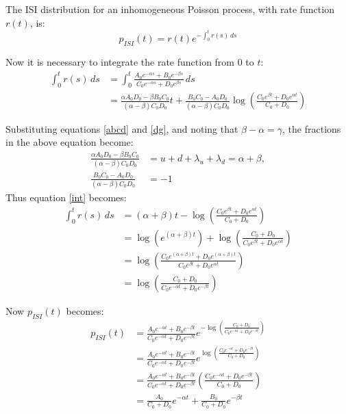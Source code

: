 \documentclass[11pt]{paper}
\begin{document}
The ISI distribution for an inhomogeneous Poisson process, with rate function $r(t)$, is:
\begin{equation}
p_{ISI}(t) = r(t) e^{-\int_0^t r(s)\,ds}
\end{equation}

Now it is necessary to integrate the rate function from $0$ to $t$:
\begin{equation}
\begin{split}
\label{int}
\int_0^t r(s)\,ds &= \int_0^t  \frac{A_0e^{-\alpha s}+B_0e^{-\beta s}}{C_0e^{-\alpha s} + D_0e^{\beta s}}\,ds\\ 
&= \frac{\alpha A_0D_0 - \beta B_0 C_0}{(\alpha - \beta)C_0D_0}t + \frac{B_0 C_0-A_0D_0}{(\alpha - \beta)C_0D_0} \log\left({\frac{C_0e^{\beta t} + D_0e^{\alpha t}}{C_0 + D_0} }\right)
\end{split}
\end{equation}

Substituting equations \ref{abcd} and \ref{dg}, and noting that $\beta-\alpha=\gamma$, the fractions in the above equation become:
\begin{equation}
\begin{split}
\frac{\alpha A_0D_0 - \beta B_0 C_0}{(\alpha - \beta)C_0D_0} &= u+d+\lambda_u+\lambda_d = \alpha+\beta,\\
 \frac{B_0 C_0-A_0D_0}{(\alpha - \beta)C_0D_0} &= -1
\end{split}
\end{equation}
Thus equation \ref{int} becomes:
\begin{equation}
\begin{split}
\int_0^t r(s)\,ds &= (\alpha+\beta)t - \log\left( {\frac{C_0e^{\beta t} + D_0e^{\alpha t}}{C_0 + D_0} }\right) \\
&= \log\left( e^{(\alpha+\beta)t}\right) + \log \left( \frac{C_0 +D_0}{C_0e^{\beta t}+ D_0e^{\alpha t}}\right)\\
&= \log \left( \frac{C_0e^{(\alpha+\beta)t}+D_0e^{(\alpha+\beta)t}}{C_0e^{\beta t}+D_0e^{\alpha t}}\right)\\
&= \log \left( \frac{C_0+D_0}{C_0e^{-\alpha t}+D_0e^{-\beta t}}\right)
\end{split}
\end{equation}

Now $p_{ISI}(t)$ becomes:
\begin{equation}
\begin{split}
p_{ISI}(t) &= \frac{A_0e^{-\alpha t}+B_0e^{-\beta t}}{C_0e^{-\alpha t} + D_0e^{-\beta t}}e^{-\log \left( \frac{C_0+D_0}{C_0e^{-\alpha t}+D_0e^{-\beta t}}\right)}\\
& = \frac{A_0e^{-\alpha t}+B_0e^{-\beta t}}{C_0e^{-\alpha t} + D_0e^{-\beta t}}e^{\log \left( \frac{C_0e^{-\alpha t}+D_0e^{-\beta t}}{C_0+D_0}\right)}\\
&= \frac{A_0e^{-\alpha t}+B_0e^{-\beta t}}{C_0e^{-\alpha t} + D_0e^{-\beta t}}\left( \frac{C_0e^{-\alpha t}+D_0e^{-\beta t}}{C_0+D_0}\right)\\
&= \frac{A_0}{C_0+D_0}e^{-\alpha t} + \frac{B_0}{C_0+D_0}e^{-\beta t}
\end{split}
\end{equation}
\end{document}
